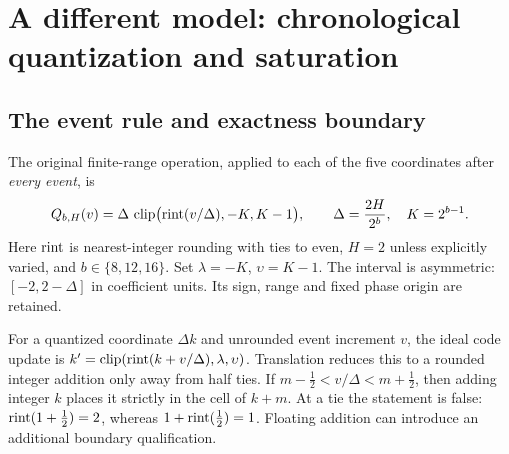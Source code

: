 \section{A different model: chronological quantization and saturation}\label{sec:maps}
\subsection{The event rule and exactness boundary}
The original finite-range operation, applied to each of the five coordinates after \emph{every event}, is
\begin{equation}\label{eq:quantizer}
 Q_{b,H}(v)=\Delta\,\operatorname{clip}\bigl(\operatorname{rint}(v/\Delta),-K,K-1\bigr),
 \qquad \Delta=\frac{2H}{2^b},\quad K=2^{b-1}.
\end{equation}
Here $\operatorname{rint}$ is nearest-integer rounding with ties to even, $H=2$ unless explicitly varied, and $b\in\{8,12,16\}$. Set $\lambda=-K$, $\upsilon=K-1$. The interval is asymmetric: $[-2,2-\Delta]$ in coefficient units. Its sign, range and fixed phase origin are retained.

For a quantized coordinate $\Delta k$ and unrounded event increment $v$, the ideal code update is
$k'=\operatorname{clip}(\operatorname{rint}(k+v/\Delta),\lambda,\upsilon)$.
Translation reduces this to a rounded integer addition only away from half ties. If $m-\tfrac12<v/\Delta<m+\tfrac12$, then adding integer $k$ places it strictly in the cell of $k+m$. At a tie the statement is false: $\operatorname{rint}(1+\tfrac12)=2$, whereas $1+\operatorname{rint}(\tfrac12)=1$. Floating addition can introduce an additional boundary qualification.

